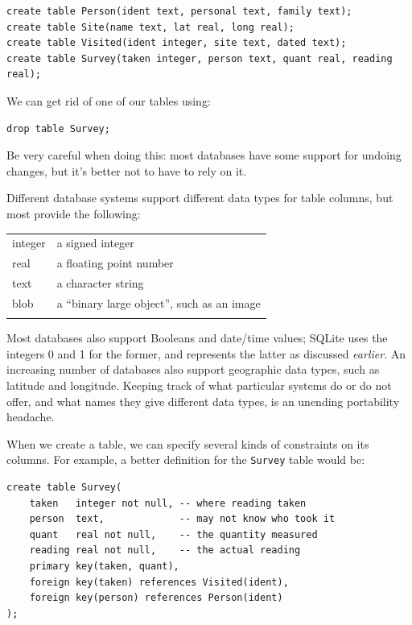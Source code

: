\documentclass[]{book}
\newcommand{\gdef}[2]{\emph{#2}}
\begin{document}
\begin{verbatim}
create table Person(ident text, personal text, family text);
create table Site(name text, lat real, long real);
create table Visited(ident integer, site text, dated text);
create table Survey(taken integer, person text, quant real, reading real);
\end{verbatim}

We can get rid of one of our tables using:

\begin{verbatim}
drop table Survey;
\end{verbatim}

Be very careful when doing this: most databases have some support for
undoing changes, but it's better not to have to rely on it.

Different database systems support different data types for table
columns, but most provide the following:

\begin{longtable}[c]{@{}ll@{}}
\hline\noalign{\medskip}
integer & a signed integer
\\\noalign{\medskip}
real & a floating point number
\\\noalign{\medskip}
text & a character string
\\\noalign{\medskip}
blob & a ``binary large object'', such as an image
\\\noalign{\medskip}
\hline
\end{longtable}

Most databases also support Booleans and date/time values; SQLite uses
the integers 0 and 1 for the former, and represents the latter as
discussed \gdef{a:dates}{earlier}. An increasing number of databases
also support geographic data types, such as latitude and longitude.
Keeping track of what particular systems do or do not offer, and what
names they give different data types, is an unending portability
headache.

When we create a table, we can specify several kinds of constraints on
its columns. For example, a better definition for the \texttt{Survey}
table would be:

\begin{verbatim}
create table Survey(
    taken   integer not null, -- where reading taken
    person  text,             -- may not know who took it
    quant   real not null,    -- the quantity measured
    reading real not null,    -- the actual reading
    primary key(taken, quant),
    foreign key(taken) references Visited(ident),
    foreign key(person) references Person(ident)
);
\end{verbatim}
\end{document}
